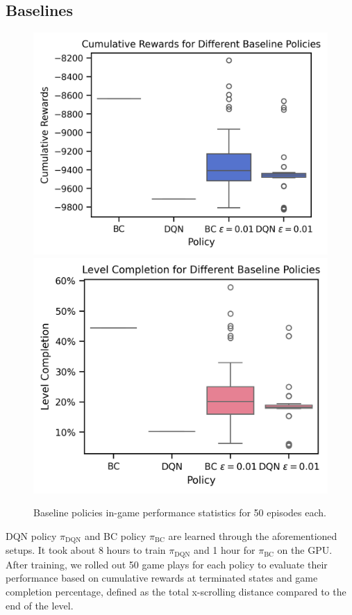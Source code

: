 \documentclass{article}
\begin{document}
\subsection{Baselines}

\begin{figure}[htbp]
      \centering
      \includegraphics[width=0.8\columnwidth]{figures/cum_rewards_baseline.png}
      \vspace{0.5cm} %
      \includegraphics[width=0.8\columnwidth]{figures/completions_baseline.png}
      \caption{Baseline policies in-game performance statistics for 50 episodes each.}
      \label{fig:baseline_policies}
\end{figure}

DQN policy $\pi_{\text{DQN}}$ and BC policy $\pi_{\text{BC}}$ are learned 
through the aforementioned setups. It took about 8 hours to train 
$\pi_{\text{DQN}}$ and 1 hour for $\pi_{\text{BC}}$ on the GPU. After training, 
we rolled out 50 game plays for each policy to evaluate their performance based 
on cumulative rewards at terminated states and game completion percentage, 
defined as the total x-scrolling distance compared to the end of the level. 
\end{document}

